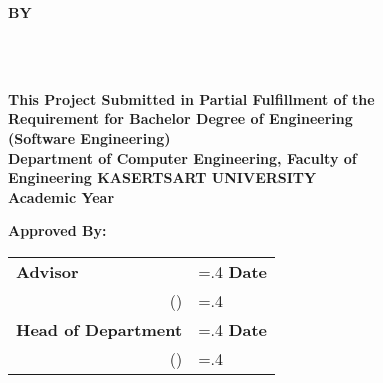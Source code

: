 \thispagestyle{empty}
\begin{center}
    {\huge\textbf{\usevar{\srsTitle}}}\vspace{1in}

    {\huge\textbf{BY}}\vspace{.5in}

    {\huge\textbf{%
        \usevar{\srsAuthorOne} \\
        \usevar{\srsAuthorTwo} \\
    }}\vfill

    {\large\textbf{%
        This Project Submitted in Partial Fulfillment of the\\
        Requirement for Bachelor Degree of Engineering\\
        (Software Engineering)\\
        Department of Computer Engineering, Faculty of\\
        Engineering KASERTSART UNIVERSITY\\
        Academic Year \usevar{\srsAcademicYear}\\
    }}
\end{center}

\vspace{.5in}

{\large\textbf{Approved By:}}\vspace{.2in}

\begin{tabularx}{1\textwidth}{X >{\hsize=.4\hsize}X}
    \textbf{Advisor}\dotfill & \textbf{Date}\dotfill \\
    \multicolumn{1}{r}{(\usevar{\srsAdvisorName})} & \\[.1in]

    \textbf{Head of Department}\dotfill & \textbf{Date}\dotfill \\
    \multicolumn{1}{r}{(\usevar{\srsHoDName})} & \\
\end{tabularx}

\restoregeometry